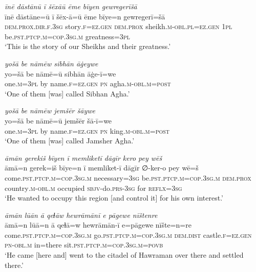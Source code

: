 \ea \label{DG.73}
\textit{īnē dāstānū ī šēxāū ēme bīyen gewregerīšā} \\ 
\gll īnē dāstāne=ū ī šēx-ā=ū ēme bīye=n gewregerī=šā \\ 
 \textsc{dem.prox}\textsc{.dir}\textsc{\textsc{.f}}\textsc{.3sg} story\textsc{\textsc{.f}}\textsc{=ez}\textsc{.gen} \textsc{dem.prox} sheikh\textsc{.m}\textsc{-obl}\textsc{.pl}=\textsc{ez.gen} \textsc{1pl} be\textsc{.pst}\textsc{.ptcp}\textsc{.m}\textsc{=cop}\textsc{.3sg}\textsc{.m} greatness\textsc{=3pl} \\ 
\glt `This is the story of our Sheikhs and their greatness.'
\z 
 

\ea \label{DP.2}
\textit{yošā be nāmēw sibhān āġeywe} \\ 
\gll yo=šā be nāmē=ū sibhān āġe-ī=we \\ 
 one\textsc{.m}\textsc{=3pl} by name\textsc{\textsc{.f}}\textsc{=ez}\textsc{.gen} \textsc{pn} agha\textsc{.m}\textsc{-obl}\textsc{.m}\textsc{=\textsc{post}} \\ 
\glt `One of them [was] called Sibhan Agha.'
\z 
 
\ea \label{DP.3}
\textit{yošā be nāmēw jemšēr šāywe} \\ 
\gll yo=šā be nāmē=ū jemšēr šā-ī=we \\ 
 one\textsc{.m}\textsc{=3pl} by name\textsc{\textsc{.f}}\textsc{=ez}\textsc{.gen} \textsc{pn} king\textsc{.m}\textsc{-obl}\textsc{.m}\textsc{=\textsc{post}} \\ 
\glt `One of them [was] called Jamsher Agha.'
\z 
 
\ea \label{DP.5}
\textit{āmān gerekiš bīyen ī memliketī dāgīr kero pey wēš} \\ 
\gll āmā=n gerek=iš bīye=n ī memliket-ī dāgīr ∅-ker-o pey wē=š \\ 
 come\textsc{.pst}\textsc{.ptcp}\textsc{.m}\textsc{=cop}\textsc{.3sg}\textsc{.m} necessary\textsc{=3sg} be\textsc{.pst}\textsc{.ptcp}\textsc{.m}\textsc{=cop}\textsc{.3sg}\textsc{.m} \textsc{dem.prox} country\textsc{.m}\textsc{-obl}\textsc{.m} occupied \textsc{sbjv-}do\textsc{.prs}\textsc{-3sg} for \textsc{reflx}\textsc{=3sg} \\ 
\glt `He wanted to occupy this region [and control it] for his own interest.'
\z 
 
\ea \label{DP.9}
\textit{āmān lūān ā qeɫāw hewrāmānī e pāgewe nīštenre} \\ 
\gll āmā=n lūā=n ā qeɫā=w hewrāmān-ī e=pāgewe nīšte=n=re \\ 
 come\textsc{.pst}\textsc{.ptcp}\textsc{.m}\textsc{=cop}\textsc{.3sg}\textsc{.m} go\textsc{.pst}\textsc{.ptcp}\textsc{.m}\textsc{=cop}\textsc{.3sg}\textsc{.m} \textsc{dem.dist} castle\textsc{\textsc{.f}}\textsc{=ez}\textsc{.gen} \textsc{pn}\textsc{-obl}\textsc{.m} in=there sit\textsc{.pst}\textsc{.ptcp}\textsc{.m}\textsc{=cop}\textsc{.3sg}\textsc{.m}\textsc{=\textsc{povb}} \\ 
\glt `He came [here and] went to the citadel of Hawraman over there and settled there.'
\z 
 
